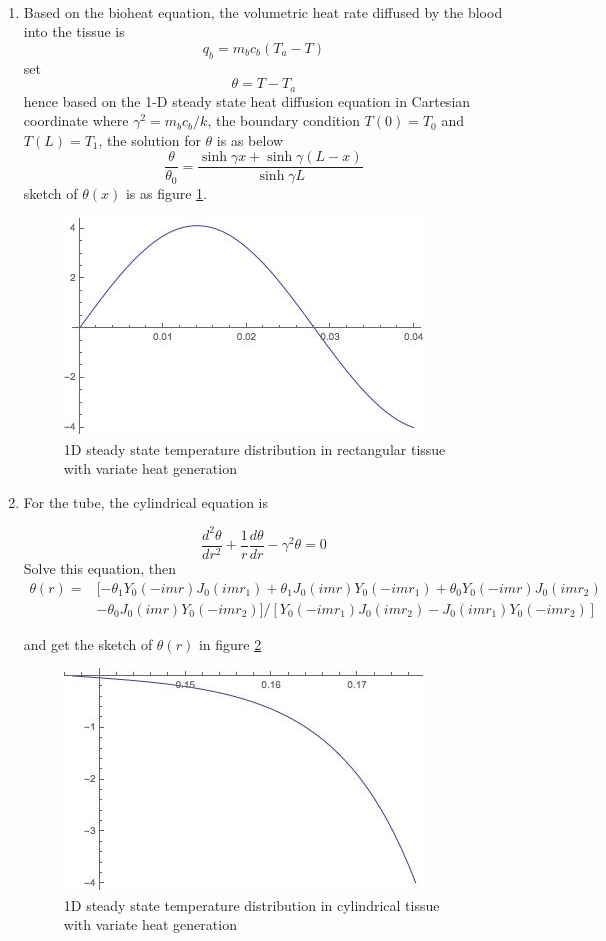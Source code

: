 \begin{solution}
~
\begin{enumerate}
\item
Based on the bioheat equation, the volumetric heat rate diffused by the blood into the tissue is 
$$q_b=m_b c_b(T_a-T)$$
set$$\theta = T-T_a$$
hence based on the 1-D steady state heat diffusion equation in Cartesian coordinate
where $\gamma^2=m_b c_b/k$, the boundary condition $T(0)=T_0$ and  $T(L)=T_1$,
the solution for $\theta$ is as below
$$\frac{\theta}{\theta_0}=\frac{\sinh\gamma x+\sinh\gamma(L-x)}{\sinh\gamma L}$$
sketch of $\theta(x)$ is as figure \ref{fig:2:10}.
\begin{figure}[h!]
  \centering
    \includegraphics[scale=0.8]{figures/ch2/10}
    \caption{1D steady state temperature distribution in rectangular tissue with variate heat generation}
    \label{fig:2:10}
\end{figure}
\item
For the tube, the cylindrical equation is

$$\frac{d^2 \theta}{dr^2} + \frac{1}{r}\frac{d\theta}{dr}-\gamma^2\theta=0$$
Solve this equation, then
\begin{equation*}
\begin{aligned}
\theta(r)=&[-\theta_1 Y_0(-i m r) J_0(i m r_1)+\theta_1 J_0(i m r) Y_0(-i m r_1)+\theta_0 Y_0(-i m r) J_0(i m r_2)\\
&-\theta_0 J_0(i m r) Y_0(-i m r_2)]/[Y_0(-i m r_1) J_0(i m r_2)-J_0(i m r_1) Y_0(-i m r_2)]
\end{aligned}
\end{equation*}

and get the sketch of $\theta(r)$ in figure \ref{fig:2:11}
\begin{figure}[H]
  \centering
    \includegraphics[scale=0.8]{figures/ch2/11}
    \caption{1D steady state temperature distribution in cylindrical tissue with variate heat generation}
    \label{fig:2:11}
\end{figure}
\end{enumerate}
\end{solution}

